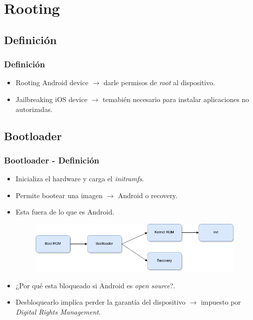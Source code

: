 \section{Rooting}

\subsection{Definición}
\begin{frame}
  \frametitle{Definición}
  \begin{itemize}
   \item Rooting Android device $\rightarrow$ darle permisos de \textit{root} al dispositivo.
   
   \item Jailbreaking iOS device $\rightarrow$ temabién necesario para instalar aplicaciones no autorizadas.
  \end{itemize}
\end{frame}

\subsection{Bootloader}
\begin{frame}
  \frametitle{Bootloader - Definición}
  \begin{itemize}
      \item Inicializa el hardware y carga el \textit{initramfs}.
      
      \item Permite bootear una imagen $\rightarrow$ Android o recovery.
          
      \item Esta fuera de lo que es Android.
      
      \begin{figure}
	\centering
	\includegraphics[scale=0.4]{images/boot-sequence.png}
      \end{figure}
      
      \item ¿Por qué esta bloqueado si Android es \textit{open source}?.
      
      \item Desbloquearlo implíca perder la garantía del dispositivo $\rightarrow$ impuesto por \emph{Digital Rights Management}.
  \end{itemize}
\end{frame}

